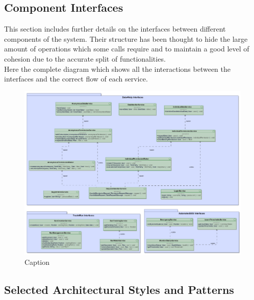 \documentclass[a4paper]{article}
\begin{document}
\subsection{Component Interfaces}
This section includes further details on the interfaces between different components of the system. Their structure has been thought to hide the large amount of operations which some calls require and to maintain a good level of cohesion due to the accurate split of functionalities.\\
Here the complete diagram which shows all the interactions between the interfaces and the correct flow of each service.

\begin{figure}[H]
    \centering
    \includegraphics[width=\linewidth]{ComponentInterfaces}
    \caption{Caption}
    \label{fig:my_label}
\end{figure}
\clearpage

\subsection{Selected Architectural Styles and Patterns}
\end{document}

